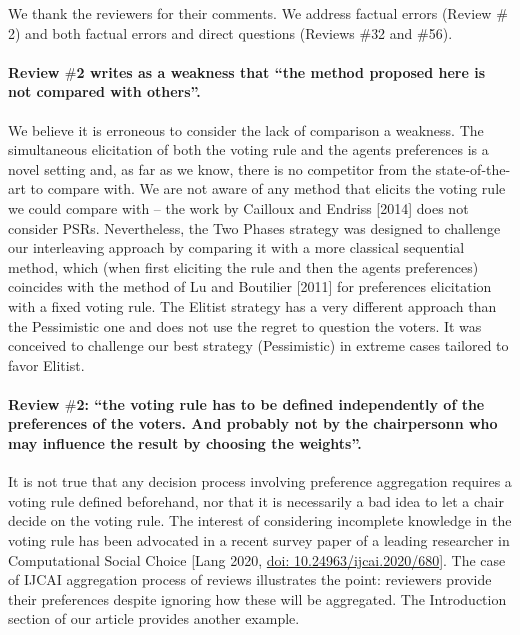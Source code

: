 \documentclass{article}
\newcommand{\commentOC}[1]{\textcolor{blue}{\small$\big[$OC: #1$\big]$}}
\begin{document}
\addtocounter{pagecount}{-4}

	We thank the reviewers for their comments. We address factual errors (Review $\#$2) and both factual errors and direct questions (Reviews $\#$32 and $\#$56).
	
\paragraph{Review $\#$2 writes as a weakness that “the method proposed here is not compared with others”.}
We believe it is erroneous to consider the lack of comparison a weakness. The simultaneous elicitation of both the voting rule and the agents preferences is a novel setting and, as far as we know, there is no competitor from the state-of-the-art to compare with. 
We are not aware of any method that elicits the voting rule we could compare with – the work by Cailloux and Endriss [2014] does not consider PSRs. Nevertheless, the Two Phases strategy was designed to challenge our interleaving approach by comparing it with a more classical sequential method, which (when first eliciting the rule and then the agents preferences) coincides with the method of Lu and Boutilier [2011] for preferences elicitation with a fixed voting rule.
The Elitist strategy has a very different approach than the Pessimistic one and does not use the regret to question the voters. It was conceived to challenge our best strategy (Pessimistic) in extreme cases tailored to favor Elitist.

\paragraph{Review $\#$2: “the voting rule has to be defined independently of the preferences of the voters. And probably not by the chairpersonn who may influence the result by choosing the weights”.}
It is not true that any decision process involving preference aggregation requires a voting rule defined beforehand, nor that it is necessarily a bad idea to let a chair decide on the voting rule. The interest of considering incomplete knowledge in the voting rule has been advocated in a recent survey paper of a leading researcher in Computational Social Choice [Lang 2020, \href{https://doi.org/10.24963/ijcai.2020/680}{doi: 10.24963/ijcai.2020/680}]. The case of IJCAI aggregation process of reviews illustrates the point: reviewers provide their preferences despite ignoring how these will be aggregated. The Introduction section of our article provides another example.
\end{document}
